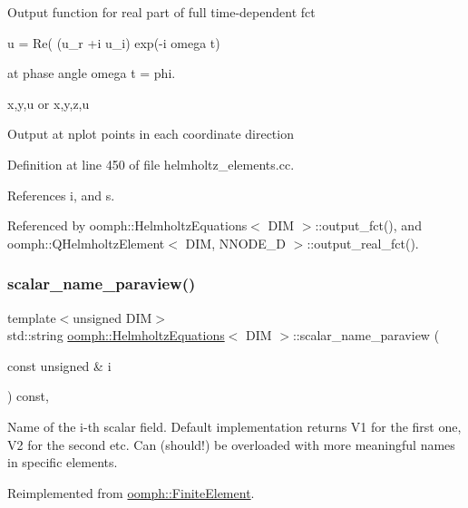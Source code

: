 Output function for real part of full time-\/dependent fct

u = Re( (u\+\_\+r +i u\+\_\+i) exp(-\/i omega t)

at phase angle omega t = phi.

x,y,u or x,y,z,u

Output at nplot points in each coordinate direction 

Definition at line 450 of file helmholtz\+\_\+elements.\+cc.



References i, and s.



Referenced by oomph\+::\+Helmholtz\+Equations$<$ D\+I\+M $>$\+::output\+\_\+fct(), and oomph\+::\+Q\+Helmholtz\+Element$<$ D\+I\+M, N\+N\+O\+D\+E\+\_\+D $>$\+::output\+\_\+real\+\_\+fct().

\mbox{\label{classoomph_1_1HelmholtzEquations_a19eb3c554208f7136c5a3a7703e94693}} 
\subsubsection{\texorpdfstring{scalar\+\_\+name\+\_\+paraview()}{scalar\_name\_paraview()}}
{\footnotesize\ttfamily template$<$unsigned D\+IM$>$ \\
std\+::string \hyperlink{classoomph_1_1HelmholtzEquations}{oomph\+::\+Helmholtz\+Equations}$<$ D\+IM $>$\+::scalar\+\_\+name\+\_\+paraview (\begin{DoxyParamCaption}\item[{const unsigned \&}]{i }\end{DoxyParamCaption}) const\hspace{0.3cm}{\ttfamily [inline]}, {\ttfamily [virtual]}}



Name of the i-\/th scalar field. Default implementation returns V1 for the first one, V2 for the second etc. Can (should!) be overloaded with more meaningful names in specific elements. 



Reimplemented from \hyperlink{classoomph_1_1FiniteElement_a49cc2d4f7ed5772bbc96f06760372b51}{oomph\+::\+Finite\+Element}.



